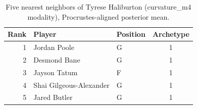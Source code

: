 \begin{table}[htbp]
  \centering\small
  \begin{tabular}{rllc}
    \toprule
    Rank & Player & Position & Archetype \\
    \midrule
    1 & Jordan Poole & G & 1 \\
    2 & Desmond Bane & G & 1 \\
    3 & Jayson Tatum & F & 1 \\
    4 & Shai Gilgeous-Alexander & G & 1 \\
    5 & Jared Butler & G & 1 \\
    \bottomrule
  \end{tabular}
  \caption{Five nearest neighbors of Tyrese Haliburton (curvature_m4 modality), Procrustes-aligned posterior mean.}
  \label{tab:Tyrese_Haliburton_neighbors_curvature_m4}
\end{table}

